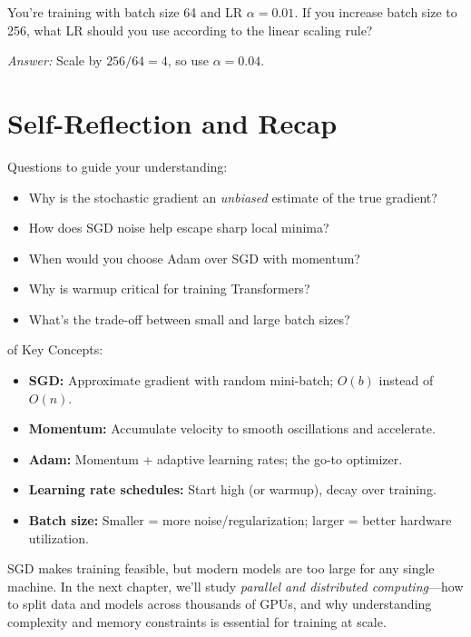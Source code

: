 \vspace{2em}
 You're training with batch size 64 and LR $\alpha = 0.01$. If you increase batch size to 256, what LR should you use according to the linear scaling rule?

\textit{Answer:} Scale by $256/64 = 4$, so use $\alpha = 0.04$.


\newpage
\section{Self-Reflection and Recap}

 Questions to guide your understanding:
\begin{itemize}
    \item Why is the stochastic gradient an \emph{unbiased} estimate of the true gradient?
    \item How does SGD noise help escape sharp local minima?
    \item When would you choose Adam over SGD with momentum?
    \item Why is warmup critical for training Transformers?
    \item What's the trade-off between small and large batch sizes?
\end{itemize}

 of Key Concepts:
\begin{itemize}
    \item \textbf{SGD:} Approximate gradient with random mini-batch; $O(b)$ instead of $O(n)$.
    \item \textbf{Momentum:} Accumulate velocity to smooth oscillations and accelerate.
    \item \textbf{Adam:} Momentum + adaptive learning rates; the go-to optimizer.
    \item \textbf{Learning rate schedules:} Start high (or warmup), decay over training.
    \item \textbf{Batch size:} Smaller = more noise/regularization; larger = better hardware utilization.
\end{itemize}



 SGD makes training feasible, but modern models are too large for any single machine. In the next chapter, we'll study \emph{parallel and distributed computing}---how to split data and models across thousands of GPUs, and why understanding complexity and memory constraints is essential for training at scale.



